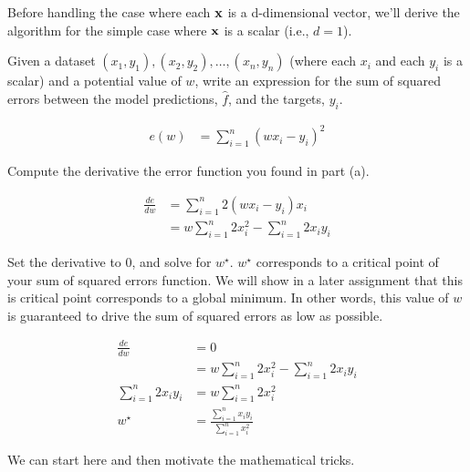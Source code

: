 \documentclass{tufte-handout}
\begin{document}
Before handling the case where each $\mathbf{x}$ is a d-dimensional vector, we'll derive the algorithm for the simple case where $\mathbf{x}$ is a scalar (i.e., $d=1$).

\begin{exercise}
\bes
\item Given a dataset $(x_1, y_1), (x_2, y_2), \ldots, (x_n, y_n)$ (where each $x_i$ and each $y_i$ is a scalar) and a potential value of $w$, write an expression for the sum of squared errors between the model predictions, $\hat{f}$, and the targets, $y_i$.

\begin{boxedsolution}
\begin{align}
e(w) &= \sum_{i=1}^n \left (  w x_i - y_i \right)^2
\end{align}
\end{boxedsolution}
\fi

\item Compute the derivative the error function you found in part (a).

\begin{boxedsolution}
\begin{align}
\frac{de}{dw} &= \sum_{i=1}^n 2 \left (  w x_i - y_i \right)x_i \\
&= w \sum_{i=1}^n 2 x_i^2 - \sum_{i=1}^n 2 x_i y_i
\end{align}
\end{boxedsolution}
\fi

\item Set the derivative to 0, and solve for $w^\star$.  $w^\star$ corresponds to a critical point of your sum of squared errors function.  We will show in a later assignment that this is critical point corresponds to a global minimum.  In other words, this value of $w$ is guaranteed to drive the sum of squared errors as low as possible.

\begin{boxedsolution}
\begin{align}
\frac{de}{dw} &= 0 \\
&= w \sum_{i=1}^n 2 x_i^2 - \sum_{i=1}^n 2 x_i y_i \\
\sum_{i=1}^n 2 x_i y_i  &= w \sum_{i=1}^n 2 x_i^2 \\
w^\star &=\frac{\sum_{i=1}^n x_i y_i}{\sum_{i=1}^n x_i^2}
\end{align}
\end{boxedsolution}
\fi

\ees


\end{exercise}
We can start here and then motivate the mathematical tricks.
\end{document}
